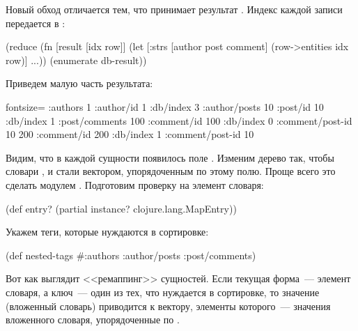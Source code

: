 Новый обход отличается тем, что  принимает результат . Индекс каждой записи передается в :

\begin{english}
  \begin{clojure}
(reduce
 (fn [result [idx row]]
   (let [{:strs [author post comment]}
         (row->entities idx row)]
     ...))
 {}
 (enumerate db-result))
  \end{clojure}
\end{english}

Приведем малую часть результата:

\begin{english}
  \begin{clojure*}{fontsize=\small}
{:authors
 {1 {:author/id 1
     :db/index 3
     :author/posts
     {10 {:post/id 10
          :db/index 1
          :post/comments
          {100 {:comment/id 100
                :db/index 0
                :comment/post-id 10}
           200 {:comment/id 200
                :db/index 1
                :comment/post-id 10}}}}}}}
  \end{clojure*}
\end{english}

Видим, что в каждой сущности появилось поле . Изменим дерево так, чтобы словари ,  и  стали вектором, упорядоченным по этому полю. Проще всего это сделать модулем . Подготовим проверку на элемент словаря:

\begin{english}
  \begin{clojure}
(def entry?
  (partial instance? clojure.lang.MapEntry))
  \end{clojure}
\end{english}

Укажем теги, которые нуждаются в сортировке:

\begin{english}
  \begin{clojure}
(def nested-tags
  #{:authors :author/posts :post/comments})
  \end{clojure}
\end{english}

Вот как выглядит <<ремаппинг>> сущностей. Если текущая форма~--- элемент словаря, а ключ~--- один из тех, что нуждается в сортировке, то значение (вложенный словарь) приводится к вектору, элементы которого~--- значения вложенного словаря, упорядоченные по .

